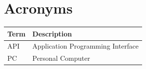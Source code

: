 \documentclass[american,paper=a4,captions=tableheading]{scrartcl}
\begin{document}
\hypertarget{acronyms}{%
\section{Acronyms}\label{acronyms}}

\begin{small}
\begin{longtable}[]{|
  >{\raggedright\arraybackslash}p{}|
  >{\raggedright\arraybackslash}p{}|}
\hline
\textbf{Term} & \textbf{Description} \\
\hline
API & Application Programming Interface \\
\hline
PC & Personal Computer \\
\hline
\end{longtable}
\end{small}
\end{document}
